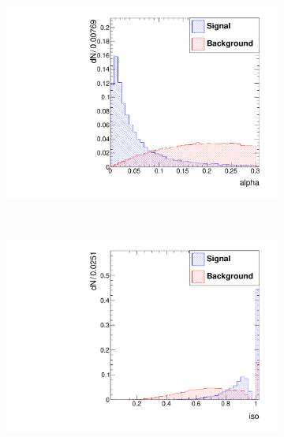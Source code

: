 \documentclass[10pt,a4paper]{article}
\begin{document}
\begin{figure}
        \begin{subfigure}[b]{0.2\textwidth}
                \centering
                \includegraphics[width=\textwidth]{Figures/alpha_barrel}
                \label{fig:alphaBarrel}
        \end{subfigure}
        ~
        \begin{subfigure}[b]{0.2\textwidth}
                \centering
                \includegraphics[width=\textwidth]{Figures/iso_barrel}
                \label{fig:isoBarrel}
        \end{subfigure}
        ~
        \begin{subfigure}[b]{0.2\textwidth}
                \centering

\end{subfigure}
\end{figure}
\end{document}
